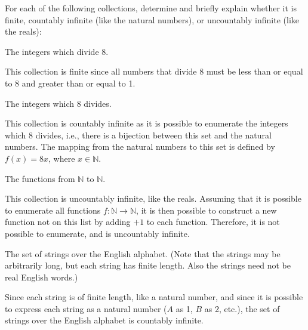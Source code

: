 \documentclass[11pt]{article}
\begin{document}

For each of the following collections, determine and briefly explain whether it
is finite, countably infinite (like the natural numbers), or uncountably infinite 
(like the reals):

\begin{Parts}

\Part The integers which divide $8$.

\begin{solution}
    
    This collection is finite since all numbers that divide 8 must be less than 
    or equal to 8 and greater than or equal to 1. 

\end{solution}

\Part The integers which $8$ divides.

\begin{solution}
    
    This collection is countably infinite as it is possible to enumerate the 
    integers which 8 divides, i.e., there is a bijection between this set and
    the natural numbers. The mapping from the natural numbers to this set is 
    defined by $f(x) = 8x$, where $x \in \mathbb{N}$.

\end{solution}

\Part The functions from $\mathbb{N}$ to $\mathbb{N}$.

\begin{solution}
    
    This collection is uncountably infinite, like the reals. Assuming that 
    it is possible to enumerate all functions $f: \mathbb{N} \to \mathbb{N}$,
    it is then possible to construct a new function not on this list by adding 
    $+1$ to each function. Therefore, it is not possible to enumerate, and is 
    uncountably infinite. 

\end{solution}

\Part The set of strings over the English alphabet. (Note that the strings may 
be arbitrarily long, but each string has finite length. Also the strings need 
not be real English words.)

\begin{solution}
    
    Since each string is of finite length, like a natural number, and since it 
    is possible to express each string as a natural number ($A$ as 1, $B$ as 2, 
    etc.), the set of strings over the English alphabet is countably infinite. 


\end{solution}
\end{Parts}
\end{document}
